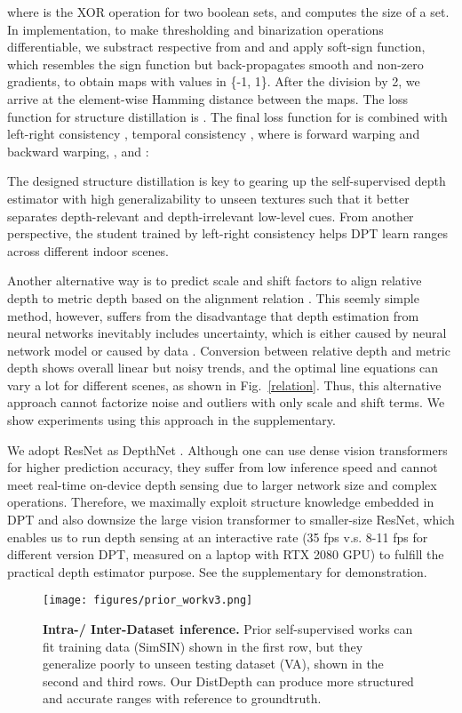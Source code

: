 \documentclass[10pt,twocolumn,letterpaper]{article}
\begin{document}
where  is the XOR operation for two boolean sets, and  computes the size of a set. In implementation, to make thresholding and binarization operations differentiable, we substract respective  from  and  and apply soft-sign function, which resembles the sign function but back-propagates smooth and non-zero gradients, to obtain maps with values in \{-1, 1\}. After the division by 2, we arrive at the element-wise Hamming distance between the maps. The loss function for structure distillation is . The final loss function  for  is combined with left-right  consistency , temporal consistency , where  is forward warping and backward warping, , and :


The designed structure distillation is key to gearing up the self-supervised depth estimator with high generalizability to unseen textures such that it better separates depth-relevant and depth-irrelevant low-level cues. From another perspective, the student trained by left-right consistency helps DPT learn ranges across different indoor scenes. 

Another alternative way is to predict scale and shift factors to align relative depth to metric depth based on the alignment relation \cite{Ranftl2020}. This seemly simple method, however, suffers from the disadvantage that depth estimation from neural networks inevitably includes uncertainty, which is either caused by neural network model or caused by data \cite{kendall2017uncertainties, kendall2018multi, maddox2019simple}. Conversion between relative depth and metric depth shows overall linear but noisy trends, and the optimal line equations can vary a lot for different scenes, as shown in Fig.~\ref{relation}. Thus, this alternative approach cannot factorize noise and outliers with only scale and shift terms. We show experiments using this approach in the supplementary.

We adopt ResNet \cite{he2016deep} as DepthNet . Although one can use dense vision transformers for higher prediction accuracy, they suffer from low inference speed and cannot meet real-time on-device depth sensing due to larger network size and complex operations. Therefore, we maximally exploit structure knowledge embedded in DPT and also downsize the large vision transformer to smaller-size ResNet, which enables us to run depth sensing at an interactive rate (35 fps v.s. 8-11 fps for different version DPT, measured on a laptop with RTX 2080 GPU) to fulfill the practical depth estimator purpose. See the supplementary for demonstration.

\begin{figure}[bt!]
    \centering
    \texttt{[image: figures/prior\_workv3.png]}
    \vspace{-16pt}
    \caption{\textbf{Intra-/ Inter-Dataset inference.} Prior self-supervised works can fit training data (SimSIN) shown in the first row, but they generalize poorly to unseen testing dataset (VA), shown in the second and third rows. Our DistDepth can produce more structured and accurate ranges with reference to groundtruth.}
    \vspace{-11pt}
    \label{prior_work}
\end{figure}
\end{document}
